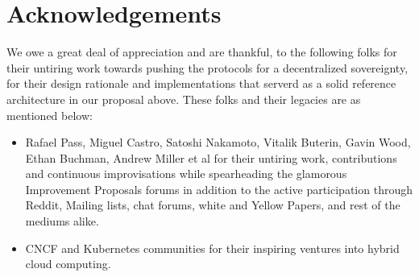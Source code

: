 \section{Acknowledgements}

We owe a great deal of appreciation and are thankful, to the following folks for their untiring work towards pushing the protocols
for a decentralized sovereignty, for their design rationale and implementations that serverd as a solid reference architecture
in our proposal above. These folks and their legacies are as mentioned below:

\begin{itemize}
  \item Rafael Pass, Miguel Castro, Satoshi Nakamoto, Vitalik Buterin, Gavin Wood, Ethan Buchman, Andrew Miller et al
  for their untiring work, contributions and continuous improvisations while spearheading the glamorous Improvement Proposals forums in
  addition to the active participation through Reddit, Mailing lists, chat forums, white and Yellow Papers, and rest of the mediums alike.
  \item CNCF and Kubernetes communities for their inspiring ventures into hybrid cloud computing.
\end{itemize}
